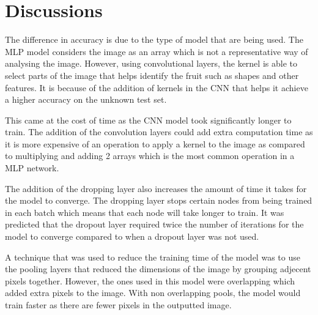 \documentclass[../main.tex]{subfiles}
\begin{document}
\section{Discussions}

The difference in accuracy is due to the type of model that are being used. The MLP model considers the image as an array which is not a representative way of analysing the image. However, using convolutional layers, the kernel is able to select parts of the image that helps identify the fruit such as shapes and other features. It is because of the addition of kernels in the CNN that helps it achieve a higher accuracy on the unknown test set.

This came at the cost of time as the CNN model took significantly longer to train. The addition of the convolution layers could add extra computation time as it is more expensive of an operation to apply a kernel to the image as compared to multiplying and adding 2 arrays which is the most common operation in a MLP network. 

The addition of the dropping layer also increases the amount of time it takes for the model to converge. The dropping layer stops certain nodes from being trained in each batch which means that each node will take longer to train. It was predicted that the dropout layer required twice the number of iterations for the model to converge compared to when a dropout layer was not used. \cite{alexnet}

A technique that was used to reduce the training time of the model was to use the pooling layers that reduced the dimensions of the image by grouping adjecent pixels together. However, the ones used in this model were overlapping which added extra pixels to the image. With non overlapping pools, the model would train faster as there are fewer pixels in the outputted image. 
\end{document}
